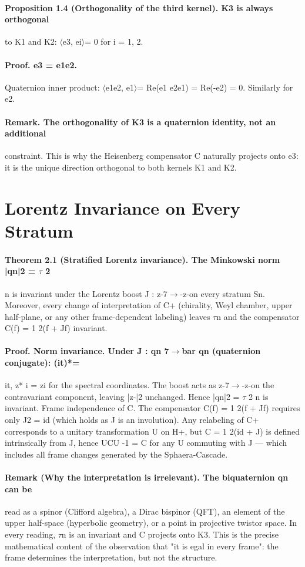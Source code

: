 \documentclass[12pt,a4paper]{article}
\begin{document}
\paragraph*{Proposition 1.4 (Orthogonality of the third kernel). K3 is always orthogonal}
to K1 and K2: $\langle$e3, ei$\rangle$= 0 for i = 1, 2.
\paragraph*{Proof. e3 = e1e2.}
Quaternion inner product: $\langle$e1e2, e1$\rangle$= Re(e1 e2e1) = Re(-e2) = 0. Similarly for e2.
\paragraph*{Remark. The orthogonality of K3 is a quaternion identity, not an additional}
constraint. This is why the Heisenberg compensator C naturally projects onto e3: it is the unique direction orthogonal to both kernels K1 and K2.

\section{Lorentz Invariance on Every Stratum}
\paragraph*{Theorem 2.1 (Stratified Lorentz invariance). The Minkowski norm |qn|2 = $\tau$ 2}
n is invariant under the Lorentz boost J : z-7$\to$-z-on every stratum Sn. Moreover, every change of interpretation of C+ (chirality, Weyl chamber, upper half-plane, or any other frame-dependent labeling) leaves $\tau$n and the compensator C(f) = 1 2(f + Jf) invariant.
\paragraph*{Proof. Norm invariance. Under J : qn 7$\to$bar qn (quaternion conjugate): (it)*=}
it, z* i = zi for the spectral coordinates. The boost acts as z-7$\to$-z-on the contravariant component, leaving |z-|2 unchanged. Hence |qn|2 = $\tau$ 2 n is invariant. Frame independence of C. The compensator C(f) = 1 2(f + Jf) requires only J2 = id (which holds as J is an involution). Any relabeling of C+ corresponds to a unitary transformation U on H+, but C = 1 2(id + J) is defined intrinsically from J, hence UCU -1 = C for any U commuting with J --- which includes all frame changes generated by the Sphaera-Cascade.
\paragraph*{Remark (Why the interpretation is irrelevant). The biquaternion qn can be}
read as a spinor (Clifford algebra), a Dirac bispinor (QFT), an element of the upper half-space (hyperbolic geometry), or a point in projective twistor space. In every reading, $\tau$n is an invariant and C projects onto K3. This is the precise mathematical content of the observation that "it is egal in every frame": the frame determines the interpretation, but not the structure.
\end{document}
